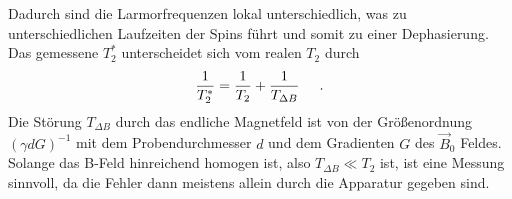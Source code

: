 \documentclass[]{scrartcl}
\begin{document}
Dadurch sind die Larmorfrequenzen lokal unterschiedlich, was zu unterschiedlichen Laufzeiten der Spins führt und somit zu einer Dephasierung.\\
Das gemessene $T_2^*$ unterscheidet sich vom realen $T_2$ durch
\begin{align}
\frac{1}{T_2^*}=\frac{1}{T_2}+\frac{1}{T_{\Delta B}}\hspace*{0.5cm}\text{.}
\end{align}
Die Störung $T_{\Delta B}$ durch das endliche Magnetfeld ist von der Größenordnung $\left(\gamma d G\right)^{-1}$ mit dem Probendurchmesser $d$ und dem Gradienten $G$  des $\vec{B}_0$ Feldes.\\
Solange das B-Feld hinreichend homogen ist, also $T_{\Delta B} \ll T_2$ ist, ist eine Messung sinnvoll, da die Fehler dann meistens allein durch die Apparatur gegeben sind.
\end{document}
